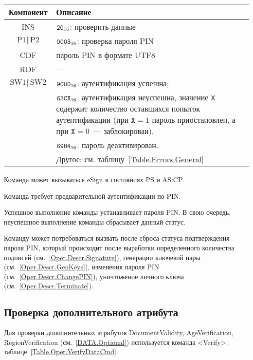 \begin{table}[hbt]
\caption{}\label{Table.Oper.VerifyPINCmd}
\begin{tabular}{|c|p{14cm}|}
\hline
Компонент & Описание \\
\hline
\hline
INS & $\texttt{20}_{16}$: проверить данные\\
\hline
$\text{P1} \parallel \text{P2}$ & $\texttt{0003}_{16}$: 
проверка пароля PIN\\
\hline
CDF & пароль PIN в формате UTF8 \\
\hline 
RDF &  --- \\
\hline
$\text{SW1} \parallel \text{SW2}$ & $\texttt{9000}_{16}$: аутентификация успешна;\\
 & $\texttt{63CX}_{16}$: аутентификация неуспешна, значение \texttt{X} содержит количество 
оставшихся попыток аутентификации (при $\texttt{X} = 1$ пароль 
приостановлен, а при $\texttt{X} = 0$~--- заблокирован).\\
& $\texttt{6984}_{16}$: пароль деактивирован. \\
 & Другое: см. таблицу~\ref{Table.Errors.General} \\
\hline
\end{tabular}
\end{table}

Команда может вызываться  eSign
в состояниях PS и AS:CP.

Команда требует предварительной аутентификации по PIN.

Успешное выполнение команды устанавливает 
 пароля PIN.
В свою очередь, неуспешное выполнение команды 
сбрасывает данный статус.

Команду может потребоваться вызвать после сброса статуса
подтверждения пароля PIN, который происходит 
после выработки определенного количества подписей (см.~\ref{Oper.Descr.Signature}),
генерации ключевой пары (см.~\ref{Oper.Descr.GenKeys}),
изменения пароля PIN (см.~\ref{Oper.Descr.ChangePIN}),
уничтожение личного ключа (см.~\ref{Oper.Descr.Terminate}).

\subsection{Проверка дополнительного атрибута}
\label{Oper.Descr.VerifyData}

Для проверки дополнительных атрибутов DocumentValidity, AgeVerification, 
RegionVerification (см.~\ref{DATA.Optional}) используется команда  <Verify>. 
 таблице~\ref{Table.Oper.VerifyDataCmd}.

